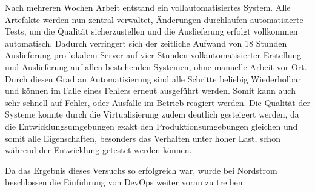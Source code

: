 Nach mehreren Wochen Arbeit entstand ein vollautomatisiertes System. 
Alle Artefakte werden nun zentral verwaltet, Änderungen durchlaufen automatisierte Tests, um die Qualität sicherzustellen und die Auslieferung erfolgt vollkommen automatisch. 
Dadurch verringert sich der zeitliche Aufwand von 18 Stunden Auslieferung pro lokalem Server auf vier Stunden vollautomatisierter Erstellung und Auslieferung auf allen bestehenden Systemen, ohne manuelle Arbeit vor Ort. 
Durch diesen Grad an Automatisierung sind alle Schritte beliebig Wiederholbar und können im Falle eines Fehlers erneut ausgeführt werden. 
Somit kann auch sehr schnell auf Fehler, oder Ausfälle im Betrieb reagiert werden. 
Die Qualität der Systeme konnte durch die Virtualisierung zudem deutlich gesteigert werden, da die Entwicklungsumgebungen exakt den Produktionsumgebungen gleichen und somit alle Eigenschaften, besonders das Verhalten unter hoher Last, schon während der Entwicklung getestet werden können. 
\parencite[Vgl.][S. 6]{Reed:2014}

Da das Ergebnis dieses Versuchs so erfolgreich war, wurde bei Nordstrom beschlossen die Einführung von DevOps weiter voran zu treiben. \parencite[Vgl.][S. 14]{Reed:2014}

